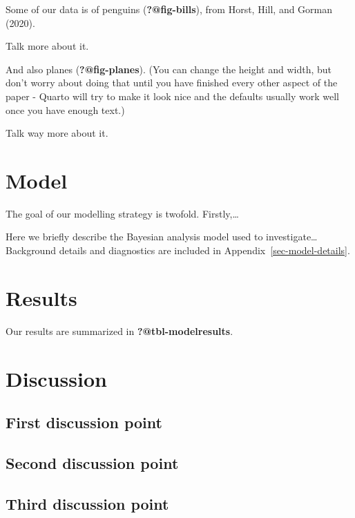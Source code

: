 \documentclass[
]{article}
\begin{document}
Some of our data is of penguins (\textbf{?@fig-bills}), from Horst,
Hill, and Gorman (2020).

Talk more about it.

And also planes (\textbf{?@fig-planes}). (You can change the height and
width, but don't worry about doing that until you have finished every
other aspect of the paper - Quarto will try to make it look nice and the
defaults usually work well once you have enough text.)

Talk way more about it.

\hypertarget{model}{%
\section{Model}\label{model}}

The goal of our modelling strategy is twofold. Firstly,\ldots{}

Here we briefly describe the Bayesian analysis model used to
investigate\ldots{} Background details and diagnostics are included in
Appendix~\ref{sec-model-details}.

\hypertarget{results}{%
\section{Results}\label{results}}

Our results are summarized in \textbf{?@tbl-modelresults}.

\hypertarget{discussion}{%
\section{Discussion}\label{discussion}}

\hypertarget{sec-first-point}{%
\subsection{First discussion point}\label{sec-first-point}}

\hypertarget{second-discussion-point}{%
\subsection{Second discussion point}\label{second-discussion-point}}

\hypertarget{third-discussion-point}{%
\subsection{Third discussion point}\label{third-discussion-point}}
\end{document}

